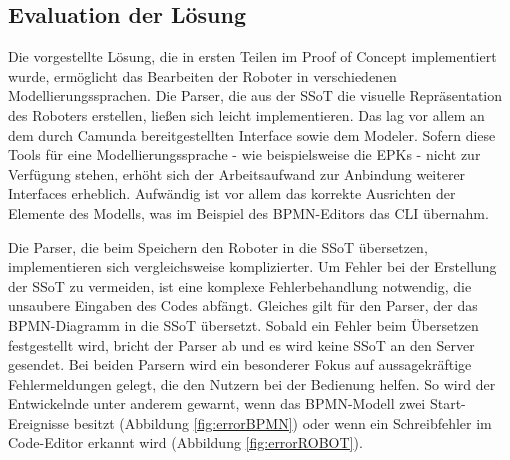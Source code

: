 \subsection{Evaluation der Lösung}
\label{evaluation_ssot}

Die vorgestellte Lösung, die in ersten Teilen im Proof of Concept implementiert wurde, ermöglicht das Bearbeiten der Roboter in verschiedenen Modellierungssprachen. Die Parser, die aus der SSoT die visuelle Repräsentation des Roboters erstellen, ließen sich leicht implementieren. Das lag vor allem an dem durch Camunda bereitgestellten Interface sowie dem  Modeler. Sofern diese Tools für eine Modellierungssprache - wie beispielsweise die EPKs - nicht zur Verfügung stehen, erhöht sich der Arbeitsaufwand zur Anbindung weiterer Interfaces erheblich. Aufwändig ist vor allem das korrekte Ausrichten der Elemente des Modells, was im Beispiel des BPMN-Editors das CLI übernahm.

Die Parser, die beim Speichern den Roboter in die SSoT übersetzen, implementieren sich vergleichsweise komplizierter. Um Fehler bei der Erstellung der SSoT zu vermeiden, ist eine komplexe Fehlerbehandlung notwendig, die unsaubere Eingaben des Codes abfängt. Gleiches gilt für den Parser, der das BPMN-Diagramm in die SSoT übersetzt. Sobald ein Fehler beim Übersetzen festgestellt wird, bricht der Parser ab und es wird keine SSoT an den Server gesendet. Bei beiden Parsern wird ein besonderer Fokus auf aussagekräftige Fehlermeldungen gelegt, die den Nutzern bei der Bedienung helfen. So wird der Entwickelnde unter anderem gewarnt, wenn das BPMN-Modell zwei Start-Ereignisse besitzt (Abbildung \ref{fig:errorBPMN}) oder wenn ein Schreibfehler im Code-Editor erkannt wird (Abbildung \ref{fig:errorROBOT}).

